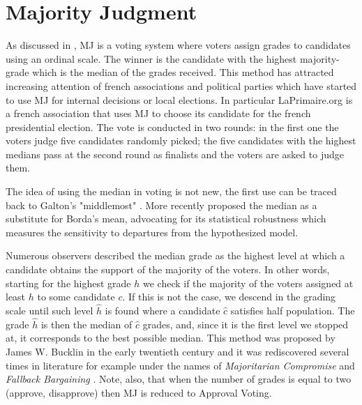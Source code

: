 \newpage
\section{Majority Judgment}
\label{sec:litMJ}

As discussed in , \ac{MJ} is a voting system where voters assign grades to candidates using an ordinal scale. The winner is the candidate with the highest majority-grade \textemdash which is the median of the grades received. This method has attracted increasing attention of french associations and political parties which have started to use \ac{MJ} for internal decisions or local elections. In particular LaPrimaire.org is a french association that uses \ac{MJ} to choose its candidate for the french presidential election. The vote is conducted in two rounds: in the first one the voters judge five candidates randomly picked; the five candidates with the highest medians pass at the second round as finalists and the voters are asked to judge them.


The idea of using the median in voting is not new, the first use can be traced back to Galton's "middlemost" \citep{Galton1907a,Galton1907b}. More recently \citet{Bassett1999} proposed the median as a substitute for Borda's mean, advocating for its statistical robustness \textemdash which measures the sensitivity to departures from the hypothesized model.

Numerous observers described the median grade as the highest level at which a candidate obtains the support of the majority of the voters. In other words, starting for the highest grade $h$ we check if the majority of the voters assigned at least $h$ to some candidate $c$. If this is not the case, we descend in the grading scale until such level $\hat{h}$ is found where a candidate $\hat{c}$ satisfies half population. The grade $\hat{h}$ is then the median of $\hat{c}$ grades, and, since it is the first level we stopped at, it corresponds to the best possible median. This method was proposed by James W. Bucklin in the early twentieth century \citep{Hoag1926} and it was rediscovered several times in literature for example under the names of \textit{Majoritarian Compromise} \citep{Sertel1986,Sertel1999} and \textit{Fallback Bargaining} \citep{Brams2001}. Note, also, that when the number of grades is equal to two (approve, disapprove) then \ac{MJ} is reduced to Approval Voting.

